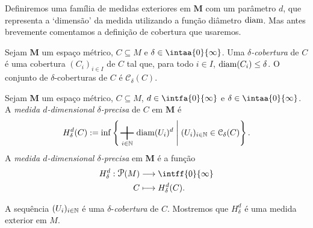 Definiremos uma família de medidas exteriores em $\bm M$ com um parâmetro $d$, que representa a `dimensão' da medida utilizando a função diâmetro $\operatorname{diam}$. Mas antes brevemente comentamos a definição de cobertura que usaremos.

\begin{defi}
Sejam $\bm M$ um espaço métrico, $C \subseteq M$ e $\delta \in \intaa{0}{\infty}$. Uma \emph{$\delta$-cobertura} de $C$ é uma cobertura $(C_i)_{i \in I}$ de $C$ tal que, para todo $i \in I$, $\operatorname{diam}(C_i) \leq \delta$. O conjunto de $\delta$-coberturas de $C$ é $\mathcal C_\delta (C)$.
\end{defi}

\begin{defi}
Sejam $\bm M$ um espaço métrico, $C \subseteq M$, $d \in \intfa{0}{\infty}$ e $\delta \in \intaa{0}{\infty}$. A \emph{medida $d$-dimensional $\delta$-precisa} de $C$ em $\bm M$ é
	\begin{equation*}
	H^d_\delta(C) := \inf\set{\sum_{i \in \N} \diam(U_i)^d}{(U_i)_{i \in \N} \in \mathcal C_\delta(C)}.
	\end{equation*}
 A \emph{medida $d$-dimensional $\delta$-precisa} em $\bm M$ é a função
 	\begin{align*}
 	\func{H^d_\delta}{\p(M)}{\intff{0}{\infty}}{C}{H^d_\delta(C)}.
 	\end{align*}
\end{defi}

A sequência $(U_i)_{i \in \mathbb{N}}$ é uma $\delta$-\emph{cobertura} de $C$. Mostremos que $H^d_\delta$ é uma medida exterior em $M$.

